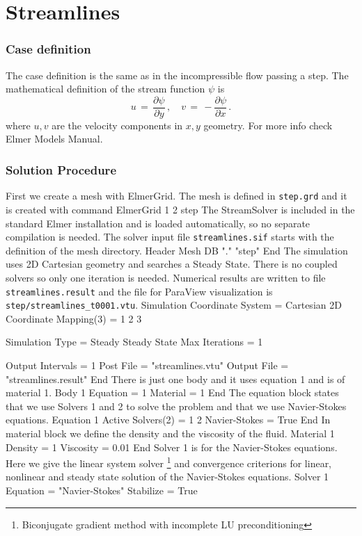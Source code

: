 \chapter{Streamlines}


\subsection*{Case definition}
The case definition is the same as in the incompressible flow passing a step.
The mathematical definition of the stream function $\psi$ is
\begin{equation}
u \, = \, \frac{\partial \psi}{\partial y} \, , \quad
v \, = \, - \frac{\partial \psi}{\partial x} \,.
\end{equation}
where $u,v$ are the velocity components in $x,y$ geometry.
For more info check Elmer Models Manual.

\subsection*{Solution Procedure}
First we create a mesh with ElmerGrid. The mesh is defined in
{\tt step.grd} and it is created with command
\ttbegin
ElmerGrid 1 2 step
\ttend
The StreamSolver is included in the standard Elmer installation and is
loaded automatically, so no separate compilation is needed.
The solver input file {\tt streamlines.sif} starts with 
the definition of the mesh directory. 
\ttbegin
Header
  Mesh DB "." "step"
End
\ttend
The simulation uses 2D Cartesian geometry and searches a Steady State.
There is no coupled solvers so only one iteration is needed. 
Numerical results are written to file {\tt streamlines.result}
and the file for ParaView visualization is {\tt step/streamlines\_t0001.vtu}.
\ttbegin
Simulation
  Coordinate System =  Cartesian 2D
  Coordinate Mapping(3) = 1 2 3

  Simulation Type = Steady
  Steady State Max Iterations = 1

  Output Intervals = 1
  Post File = "streamlines.vtu"
  Output File = "streamlines.result"
End
\ttend
There is just one body and it uses equation 1 and
is of material 1.
\ttbegin
Body 1
  Equation = 1
  Material = 1
End
\ttend
The equation block states that we use Solvers 1 and 2 to solve the problem
and that we use Navier-Stokes equations.
\ttbegin
Equation 1
  Active Solvers(2) = 1 2
  Navier-Stokes = True
End
\ttend
In material block we define the density and the viscosity of the fluid.
\ttbegin
Material 1
  Density = 1
  Viscosity = 0.01
End
\ttend
Solver 1 is for the Navier-Stokes equations.
Here we give the linear system solver
\footnote{Biconjugate gradient method with incomplete LU preconditioning}
and convergence criterions for linear, nonlinear and steady state 
solution of the Navier-Stokes equations.
\ttbegin
Solver 1
  Equation = "Navier-Stokes"
  Stabilize = True

